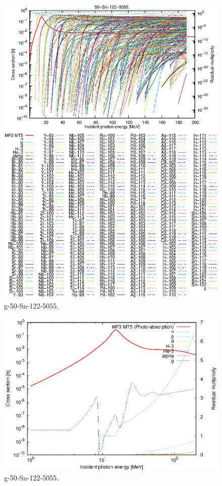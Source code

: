 \begin{figure}
 \includegraphics[width=\linewidth]{eps/g_50-Sn-122_5055.eps}
  \caption{g-50-Sn-122-5055.}
\end{figure}
\newpage \clearpage

\begin{figure}
 \includegraphics[width=\linewidth]{eps-log/g_50-Sn-122_5055.eps}
 \caption{g-50-Sn-122-5055.}
\end{figure}
\newpage \clearpage

